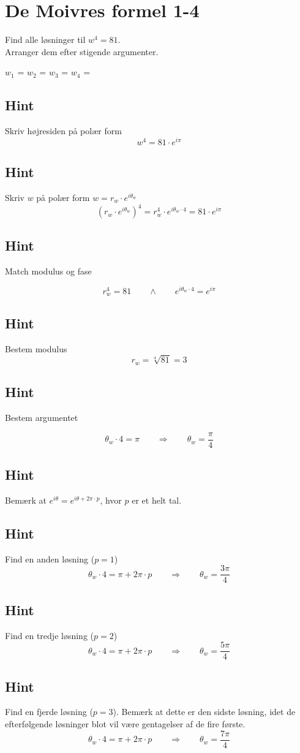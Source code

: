 \documentclass{article}
\newenvironment{exercise}[1]{\newpage\section{#1}}{}
\newcommand{\answerbox}[1]{\fbox{$#1$}}
\newcommand{\hint}{\subsection*{Hint}}
\begin{document}
\begin{exercise}{De Moivres formel 1-4}
	
	Find alle løsninger til $w^4=81$. \\
	Arranger dem efter stigende argumenter.
	
	$w_1$ = \answerbox{3 \cdot e^{i \frac{\pi}{4}}}		$w_2$ = \answerbox{3 \cdot e^{i \frac{3 \pi}{4}}}		$w_3$ = \answerbox{3 \cdot e^{i \frac{5 \pi}{4}}}		$w_4$ = \answerbox{3 \cdot e^{i \frac{7 \pi}{4}}}	 
	
	
	\hint 
	
	Skriv højresiden på polær form
	\[
	w^4 = 81 \cdot e^{i \pi}
	\]
	
	
	\hint
	
	Skriv $w$ på polær form $w = r_w \cdot e^{i \theta_w}$
	\[
	\left(r_w \cdot e^{i \theta_w}\right)^4 = r_w^4 \cdot e^{i \theta_w \cdot 4} = 81 \cdot e^{i \pi}
	\]
	
	\hint 
	Match modulus og fase
	
	\[
	r_w^4 = 81 \qquad \wedge \qquad e^{i \theta_w \cdot 4} = e^{i \pi}
	\]
	
	\hint
	
	Bestem modulus
	\[
	r_w  =  \sqrt[4]{81} = 3
	\]
	
	\hint
	
	Bestem argumentet
	
	\[
	\theta_w \cdot 4 = \pi \qquad \Rightarrow \qquad  \theta_w = \frac{\pi}{4}
	\]
	
	\hint
	
	Bemærk at $e^{i \theta} = e^{i \theta + 2 \pi \cdot p}$, hvor $p$ er et helt tal.
	
	\hint
	
	Find en anden løsning ($p=1$)
	\[
	\theta_w \cdot 4 = \pi  + 2 \pi \cdot p \qquad \Rightarrow \qquad  \theta_w = \frac{3 \pi}{4}
	\]
	
	\hint
	
	Find en tredje løsning ($p=2$)
	\[
	\theta_w \cdot 4 = \pi  + 2 \pi \cdot p \qquad \Rightarrow  \qquad  \theta_w = \frac{5 \pi}{4}
	\]
	
	\hint
	
	Find en fjerde løsning ($p=3$). Bemærk at dette er den sidste løsning, idet de efterfølgende løsninger blot vil være gentagelser af de fire første. 
	\[
	\theta_w \cdot 4 = \pi  + 2 \pi \cdot p \qquad \Rightarrow  \qquad  \theta_w = \frac{7 \pi}{4}
	\]
	
\end{exercise}

\newpage
\end{document}
